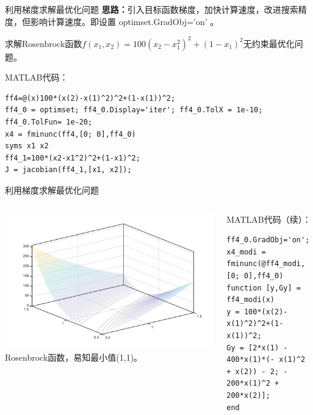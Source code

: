 \documentclass[10pt]{beamer}
\begin{document}
\begin{frame}[fragile]{利用梯度求解最优化问题}
\textbf{思路：}引入目标函数梯度，加快计算速度，改进搜索精度，但影响计算速度。即设置 optimset.GradObj='on' 。
	
	\begin{example}[6-14]
求解Rosenbrock函数$f\left(x_{1}, x_{2}\right)=100\left(x_{2}-x_{1}^{2}\right)^{2}+\left(1-x_{1}\right)^{2}$无约束最优化问题。
	\end{example}
	
	\begin{block}{MATLAB代码：}
\begin{lstlisting}
ff4=@(x)100*(x(2)-x(1)^2)^2+(1-x(1))^2;
ff4_0 = optimset; ff4_0.Display='iter'; ff4_0.TolX = 1e-10; ff4_0.TolFun= 1e-20;
x4 = fminunc(ff4,[0; 0],ff4_0)
syms x1 x2
ff4_1=100*(x2-x1^2)^2+(1-x1)^2;
J = jacobian(ff4_1,[x1, x2]);
\end{lstlisting}
	\end{block}				
\end{frame}
\begin{frame}[fragile]{利用梯度求解最优化问题}
	\begin{columns}[T]
	\includegraphics[width=\textwidth]{24}
		Rosenbrock函数，易知最小值(1,1)。

\begin{block}{MATLAB代码（续）：}
\begin{lstlisting}
ff4_0.GradObj='on';
x4_modi = fminunc(@ff4_modi,[0; 0],ff4_0)
function [y,Gy] = ff4_modi(x)
y = 100*(x(2)-x(1)^2)^2+(1-x(1))^2;
Gy = [2*x(1) - 400*x(1)*(- x(1)^2 + x(2)) - 2; - 200*x(1)^2 + 200*x(2)];
end
\end{lstlisting}
\end{block}	
	\end{columns}

\end{frame}
\end{document}
